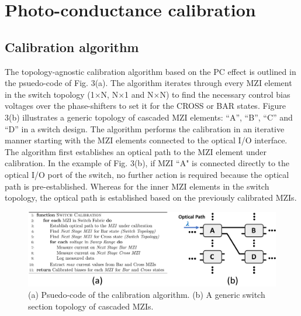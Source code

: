 


\section{Photo-conductance calibration}

\subsection{Calibration algorithm}
The topology-agnostic calibration algorithm based on the PC effect is outlined in the psuedo-code of Fig. 3(a). The algorithm iterates through every MZI element in the switch topology (1$\times$N, N$\times$1 and N$\times$N) to find the necessary control bias voltages over the phase-shifters to set it for the CROSS or BAR states. Figure 3(b) illustrates a generic topology of cascaded MZI elements: ``A'', ``B'', ``C'' and ``D'' in a switch design. The algorithm performs the calibration in an iterative manner starting with the MZI elements connected to the optical I/O interface. The algorithm first establishes an optical path to the MZI element under calibration. In the example of Fig. 3(b), if MZI ``A" is connected directly to the optical I/O port of the switch, no further action is required because the optical path is pre-established. Whereas for the inner MZI elements in the switch topology, the optical path is established based on the previously calibrated MZIs.


\begin{figure}[ht!]
\centering\includegraphics[width=13.5cm]{Chapter5/fig3_alg}
\caption{(a) Psuedo-code of the calibration algorithm. (b) A generic switch section topology of cascaded MZIs. }
\end{figure}

